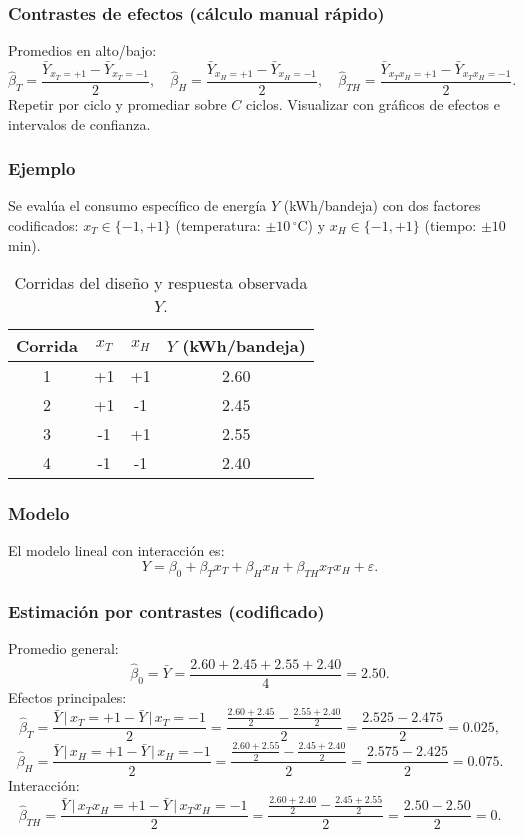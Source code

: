\subsubsection*{Contrastes de efectos (cálculo manual rápido)}
Promedios en alto/bajo:
\[
\hat{\beta}_T=\frac{\bar{Y}_{x_T=+1}-\bar{Y}_{x_T=-1}}{2},\quad
\hat{\beta}_H=\frac{\bar{Y}_{x_H=+1}-\bar{Y}_{x_H=-1}}{2},\quad
\hat{\beta}_{TH}=\frac{\bar{Y}_{x_Tx_H=+1}-\bar{Y}_{x_Tx_H=-1}}{2}.
\]
Repetir por ciclo y promediar sobre $C$ ciclos. Visualizar con gráficos de efectos e intervalos de confianza.

\subsubsection*{Ejemplo}
Se evalúa el consumo específico de energía $Y$ (kWh/bandeja) con dos factores codificados:
$x_T\in\{-1,+1\}$ (temperatura: $\pm 10\,^{\circ}\mathrm{C}$) y
$x_H\in\{-1,+1\}$ (tiempo: $\pm 10$ min).

\begin{table}[H]\centering
\caption{Corridas del diseño y respuesta observada $Y$.}
\begin{tabular}{cccc}
\toprule
Corrida & $x_T$ & $x_H$ & $Y$ (kWh/bandeja) \\
\midrule
1 & +1 & +1 & 2.60 \\
2 & +1 & -1 & 2.45 \\
3 & -1 & +1 & 2.55 \\
4 & -1 & -1 & 2.40 \\
\bottomrule
\end{tabular}
\end{table}

\subsubsection*{Modelo}
El modelo lineal con interacción es:
\[
Y = \beta_0 + \beta_T x_T + \beta_H x_H + \beta_{TH} x_T x_H + \varepsilon.
\]
\subsubsection*{Estimación por contrastes (codificado)}
Promedio general:
\[
\hat{\beta}_0 = \bar{Y} = \frac{2.60+2.45+2.55+2.40}{4} = 2.50.
\]
Efectos principales:
\[
\hat{\beta}_T =
\frac{\bar{Y}\,\big|\,x_T=+1 - \bar{Y}\,\big|\,x_T=-1}{2}
=
\frac{\frac{2.60+2.45}{2} - \frac{2.55+2.40}{2}}{2}
=
\frac{2.525 - 2.475}{2} = 0.025,
\]
\[
\hat{\beta}_H =
\frac{\bar{Y}\,\big|\,x_H=+1 - \bar{Y}\,\big|\,x_H=-1}{2}
=
\frac{\frac{2.60+2.55}{2} - \frac{2.45+2.40}{2}}{2}
=
\frac{2.575 - 2.425}{2} = 0.075.
\]
Interacción:
\[
\hat{\beta}_{TH} =
\frac{\bar{Y}\,\big|\,x_Tx_H=+1 - \bar{Y}\,\big|\,x_Tx_H=-1}{2}
=
\frac{\frac{2.60+2.40}{2} - \frac{2.45+2.55}{2}}{2}
=
\frac{2.50 - 2.50}{2} = 0.
\]


